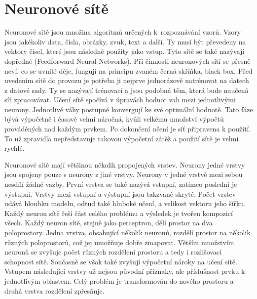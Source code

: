\section{Neuronové sítě}
Neuronové sítě jsou množina algoritmů určených k~rozpoznávání vzorů.
Vzory jsou jakékoliv data, čísla, obrázky, zvuk, text a další.
Ty musí být převedeny na vektory čísel, 
které jsou následně použity jako vstup.
Tyto sítě se také nazývají dopředné (Feedforward Neural Networks).
Při činnosti neuronových sítí se přesně neví,
co se uvnitř děje,
fungují na principu zvaném černá skříňka, black box.
Před uvedením sítě do provozu je potřeba 
ji nejprve jednorázově natrénovat na datech z datové sady.
Ty se nazývají trénovací a jsou podobná těm, 
která bude naučená síť zpracovávat.
Učení sítě spočívá v úpravách hodnot vah mezi jednotlivými neurony.
Jednotlivé váhy postupně konvergují ke své optimální hodnotě.
Tato fáze bývá výpočetně i časově velmi náročná,
kvůli velkému množství výpočtů prováděných nad každým prvkem. 
Po dokončení učení je síť připravena k použití.
To už zpravidla nepředstavuje takovou výpočetní zátěž
a použití sítě je velmi rychlé.
\cite{Goodfellow-et-al-2016, Nicholson_NeuralNets, Kvasnicka_NeuronoveSite, Mehrotra_ElementsOfNNs}
\par

Neuronové sítě mají většinou několik propojených vrstev.
Neurony jedné vrstvy jsou spojeny pouze s neurony z jiné vrstvy.
Neurony v jedné vrstvě mezi sebou nesdílí žádné vazby.
První vrstva se také nazývá vstupní, 
zatímco poslední je výstupní.
Vrstvy mezi vstupní a výstupní jsou takzvaně skryté.
Počet vrstev udává hloubku modelu, odtud také hluboké učení, 
a velikost vektoru jeho šířku.
Každý neuron sítě řeší část celého problému 
a výsledek je tvořen kompozicí všech.
Každý neuron sítě, stejně jako perceptron, 
dělí prostor na dva poloprostory.
Jedna vrstva, obsahující několik neuronů, 
rozdělí prostor na několik různých poloprostorů,
což jej umožňuje dobře zmapovat.
Větším množstvím neuronů se zvyšuje počet různých rozdělení prostoru
a tedy i rozlišovací schopnost sítě.
Současně se však také zvyšují výpočetní nároky na učení sítě.
Vstupem následující vrstvy už nejsou původní příznaky,
ale příslušnost prvku k jednotlivým oblastem.
Celý problém je transformován do nového prostoru 
a druhá vrstva rozdělení zpřesňuje.
\cite{Goodfellow-et-al-2016, Nicholson_NeuralNets, Kvasnicka_NeuronoveSite, Mehrotra_ElementsOfNNs}

